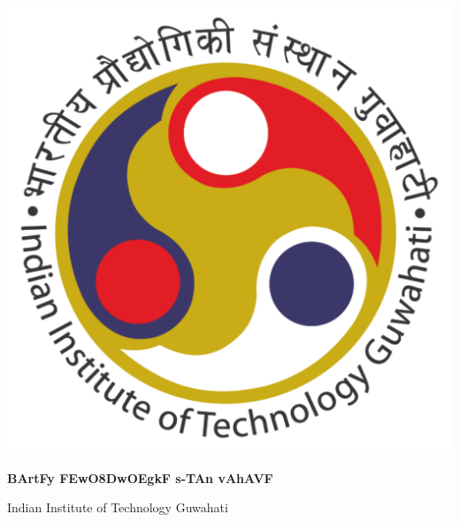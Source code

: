 \def\DevnagVersion{2.15}\documentclass[12pt]{article}
\begin{document}
\thispagestyle{empty}



\vspace*{-0.5in}
%

\begin{minipage}[h]{0.2\linewidth}
\hspace*{-.25in}\includegraphics[scale=.1]{logo.pdf}  
\end{minipage}
\begin{minipage}[h]{0.4\linewidth}
\hspace*{-.5in}
{\bf {\dn  BArtFy \3FEwO\38DwOEgkF s\2-TAn vAhAVF }}

\vspace*{-.05in}\hspace*{-.5in}
{} 

\hspace*{-.5in}
{  \hspace*{-.1in} Indian Institute of Technology Guwahati }

\vspace*{-.05in}\hspace*{-.5in}
{} 


\end{minipage}
\end{document}

